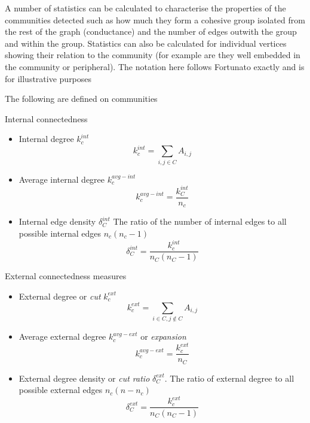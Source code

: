 A number of statistics can be calculated to characterise the properties of the communities detected such as how much they form a cohesive group isolated from the rest of the graph (conductance) and the number of edges outwith the group and within the group\cite{fortunato2016community}. Statistics can also be calculated for individual vertices showing their relation to the community (for example are they well embedded in the community or peripheral). The notation here follows Fortunato\cite{fortunato2016community} exactly and is for illustrative purposes 

The following are defined on communities

Internal connectedness
\begin{itemize}
    \item Internal degree $k_c^{int}$
    \begin{equation}
        k_c^{int}=\sum_{i,j\in C}A_{i,j}
    \end{equation}
    \item Average internal degree $k_c^{avg-int}$
    \begin{equation}
        k_c^{avg-int}=\frac{k_C^{int}}{n_c}
    \end{equation}
    \item Internal edge density $\delta_C^{int}$ The ratio of the number of internal edges to all possible internal edges $n_c(n_c-1)$
    \begin{equation}
        \delta_C^{int} = \frac{k_c^{int}}{n_C(n_C-1)}
    \end{equation}
    \end{itemize}
    External connectedness measures 
    \begin{itemize}
    \item External degree or \textit{cut} $k_c^{ext}$
    \begin{equation}
    k_c^{ext}=\sum_{i \in C, j \notin C}A_{i,j}
    \end{equation}
    \item Average external degree $k_c^{avg-ext}$ or \textit{expansion}
    \begin{equation}
        k_c^{avg-ext}=\frac{ k_c^{ext}}{n_C}
    \end{equation}
    \item External degree density or \textit{cut ratio} $\delta_C^{ext}$. The ratio of external degree to all possible external edges $n_c(n-n_c)$
    \begin{equation}
        \delta_C^{ext}=\frac{ k_c^{ext}}{n_C(n_C-1)}
    \end{equation}
    \end{itemize}
